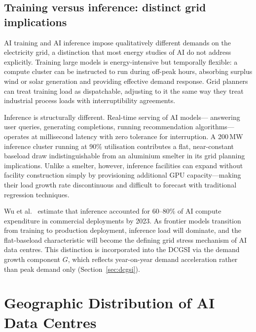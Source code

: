 \documentclass[preprint,12pt]{elsarticle}
\begin{document}
\subsection{Training versus inference: distinct grid implications}
\label{subsec:training_inference}

AI training and AI inference impose qualitatively different demands on the
electricity grid, a distinction that most energy studies of AI do not
address explicitly. Training large models is energy-intensive but
temporally flexible: a compute cluster can be instructed to run during
off-peak hours, absorbing surplus wind or solar generation and providing
effective demand response. Grid planners can treat training load as
dispatchable, adjusting to it the same way they treat industrial process
loads with interruptibility agreements.

Inference is structurally different. Real-time serving of AI models---
answering user queries, generating completions, running recommendation
algorithms---operates at millisecond latency with zero tolerance for
interruption. A 200\,MW inference cluster running at 90\% utilisation
contributes a flat, near-constant baseload draw indistinguishable from an
aluminium smelter in its grid planning implications. Unlike a smelter,
however, inference facilities can expand without facility construction
simply by provisioning additional GPU capacity---making their load growth
rate discontinuous and difficult to forecast with traditional regression
techniques.

Wu et al.\ \cite{wu2022sustainable} estimate that inference accounted
for 60--80\% of AI compute expenditure in commercial deployments by 2023.
As frontier models transition from training to production deployment,
inference load will dominate, and the flat-baseload characteristic will
become the defining grid stress mechanism of AI data centres. This
distinction is incorporated into the DCGSI via the demand growth component
$G$, which reflects year-on-year demand acceleration rather than peak
demand only (Section~\ref{sec:dcgsi}).

\section{Geographic Distribution of AI Data Centres}
\label{sec:geography}
\end{document}
